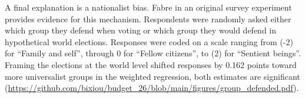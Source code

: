 \documentclass[11pt,a4paper]{article}
\begin{document}


A final explanation is a nationalist bias. Fabre in an original survey experiment provides evidence for this mechanism. Respondents were randomly asked either which group they defend when voting or which group they would defend in hypothetical world elections. Responses were coded on a scale ranging from (-2) for ``Family and self'', through \(0\) for ``Fellow citizens'', to (2) for ``Sentient beings''. Framing the elections at the world level shifted responses by 0.162 points toward more universalist groups in the weighted regression, both estimates are significant (\url{https://github.com/bixiou/budget_26/blob/main/figures/group_defended.pdf}). 

\newpage


\end{document}
